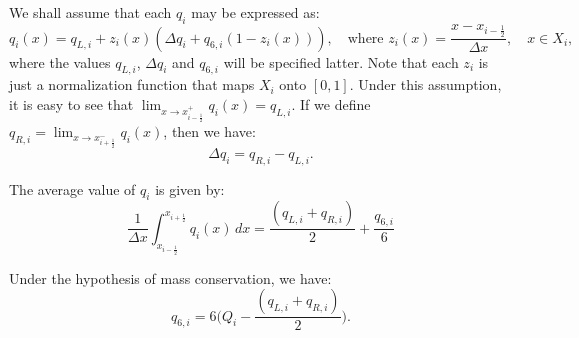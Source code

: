 We shall assume that each $q_i$ may be expressed as:
\begin{equation}
	\label{chp1-sec-recon-ppm-eq1}
	q_i(x) = q_{L, i} + z_i(x)(\Delta q_i + q_{6, i}(1-z_i(x))), 
	\quad \text{where }
	z_i(x) = \frac{x-x_{i-\frac{1}{2}}}{\Delta x},
	\quad x \in X_i,
\end{equation}
where the values $q_{L, i}$, $\Delta q_i$ and $q_{6, i}$  will be specified latter.
Note that each $z_i$ is just a normalization function that maps $X_i$ onto $[0,1]$.
Under this assumption, it is easy to see that 
$\lim_{x \to x_{i-\frac{1}{2}}^+} {q_i(x)} = q_{L, i}$.
If we define $q_{R, i} = \lim_{x \to x_{i+\frac{1}{2}}^-} {q_i(x)}$,
then we have:
\begin{equation}
	\label{chp1-sec-recon-ppm-eq2}
	\Delta q_i = q_{R, i} - q_{L, i}.
\end{equation}

The average value of $q_i$ is given by:
\begin{equation}
	\label{chp1-sec-recon-ppm-eq3}
	\frac{1}{\Delta x}\int_{x_{i-\frac{1}{2}}}^{x_{i+\frac{1}{2}}} {q}_i(x) \,dx
	= \frac{(q_{L,i} + q_{R,i})}{2} + \frac{q_{6,i}}{6}
\end{equation}

Under the hypothesis of mass conservation, we have:
\begin{equation}
	\label{chp1-sec-recon-ppm-eq4}
	q_{6,i} = 6\bigg(Q_i - \frac{(q_{L,i} + q_{R,i})}{2}\bigg).
\end{equation}

